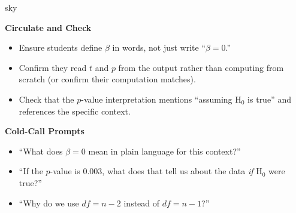 \documentclass[10pt]{article}
\begin{document}
\begin{skillbox}{sky}
\begin{minipage}[t]{0.48\linewidth}
    \textbf{Circulate and Check}
    \begin{itemize}
        \item Ensure students define $\beta$ in words, not just write ``$\beta = 0$.''
        \item Confirm they read $t$ and $p$ from the output rather than computing
              from scratch (or confirm their computation matches).
        \item Check that the $p$-value interpretation mentions ``assuming H$_0$ is
              true'' and references the specific context.
    \end{itemize}
\end{minipage}
\hfill
\begin{minipage}[t]{0.48\linewidth}
    \textbf{Cold-Call Prompts}
    \begin{itemize}
        \item ``What does $\beta = 0$ mean in plain language for this context?''
        \item ``If the $p$-value is 0.003, what does that tell us about the data
              \emph{if} H$_0$ were true?''
        \item ``Why do we use $df = n - 2$ instead of $df = n - 1$?''
    \end{itemize}
\end{minipage}
\end{skillbox}
\end{document}
